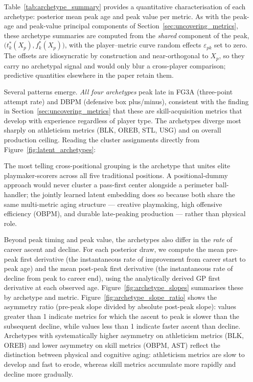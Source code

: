 Table~\ref{tab:archetype_summary} provides a quantitative characterisation of each archetype: posterior mean peak age and peak value per metric.  As with the peak-age and peak-value principal components of Section~\ref{sec:uncovering_metrics}, these archetype summaries are computed from the \emph{shared} component of the peak, $\big(t^{*}_k(X_p), f^{*}_k(X_p)\big)$, with the player--metric curve random effects $\varepsilon_{pk}$ set to zero.  The offsets are idiosyncratic by construction and near-orthogonal to $X_p$, so they carry no archetypal signal and would only blur a cross-player comparison; predictive quantities elsewhere in the paper retain them.



Several patterns emerge.  \emph{All four archetypes} peak late in FG3A (three-point attempt rate) and DBPM (defensive box plus/minus), consistent with the finding in Section~\ref{sec:uncovering_metrics} that these are skill-acquisition metrics that develop with experience regardless of player type.  The archetypes diverge most sharply on athleticism metrics (BLK, OREB, STL, USG) and on overall production ceiling.  Reading the cluster assignments directly from Figure~\ref{fig:latent_archetypes}:

The most telling cross-positional grouping is the archetype that unites elite playmaker-scorers across all five traditional positions.  A positional-dummy approach would never cluster a pass-first center alongside a perimeter ball-handler; the jointly learned latent embedding does so because both share the same multi-metric aging structure --- creative playmaking, high offensive efficiency (OBPM), and durable late-peaking production --- rather than physical role.

Beyond peak timing and peak value, the archetypes also differ in the \emph{rate} of career ascent and decline.  For each posterior draw, we compute the mean pre-peak first derivative (the instantaneous rate of improvement from career start to peak age) and the mean post-peak first derivative (the instantaneous rate of decline from peak to career end), using the analytically derived GP first derivative at each observed age.  Figure~\ref{fig:archetype_slopes} summarises these by archetype and metric.  Figure~\ref{fig:archetype_slope_ratio} shows the asymmetry ratio (pre-peak slope divided by absolute post-peak slope): values greater than 1 indicate metrics for which the ascent to peak is slower than the subsequent decline, while values less than 1 indicate faster ascent than decline.  Archetypes with systematically higher asymmetry on athleticism metrics (BLK, OREB) and lower asymmetry on skill metrics (OBPM, AST) reflect the distinction between physical and cognitive aging: athleticism metrics are slow to develop and fast to erode, whereas skill metrics accumulate more rapidly and decline more gradually.

